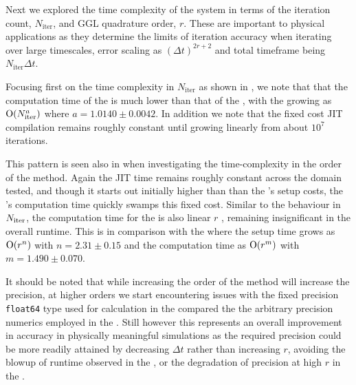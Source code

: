 Next we explored the time complexity of the system in terms of the iteration count, $N_{\text{iter}}$, and GGL quadrature order, $r$. These are important to physical applications as they determine the limits of iteration accuracy when iterating over large timescales, error scaling as $(\Delta t)^{2r + 2}$ and total timeframe being $N_{\text{iter}} \Delta t$.

Focusing first on the time complexity in $N_{\text{iter}}$ as shown in , we note that that the computation time of the \updimpl{} is much lower than that of the \orgimpl{}, with the \updimpl{} growing as $\mathord{\mathrm{O}}(N_{\mathrm{iter}}^a)$ where $a = 1.0140 \pm 0.0042$. In addition we note that the fixed cost JIT compilation remains roughly constant until growing linearly from about $10^7$ iterations.

This pattern is seen also in  when investigating the time-complexity in the order of the method. Again the JIT time remains roughly constant across the domain tested, and though it starts out initially higher than than the \orgimpl{}'s setup costs, the \orgimpl{}'s computation time quickly swamps this fixed cost.
Similar to the behaviour in $N_{\mathrm{iter}}$, the computation time for the \updimpl{} is also linear $r$ , remaining insignificant in the overall runtime. This is in comparison with the \orgimpl{} where the setup time grows as $\mathord{\mathrm{O}}(r^n)$ with $n = {2.31 \pm 0.15}$ and the computation time as $\mathord{\mathrm{O}}(r^m)$ with $m={1.490 \pm 0.070}$.


It should be noted that while increasing the order of the method will increase the precision, at higher orders we start encountering issues with the fixed precision \texttt{float64} type used for calculation in the \updimpl{} compared the the arbitrary precision numerics employed in the \orgimpl{}.
Still however this represents an overall improvement in accuracy in physically meaningful simulations as the required precision could be more readily attained by decreasing $\Delta t$ rather than increasing $r$, avoiding the blowup of runtime observed in the \orgimpl{}, or the degradation of precision at high $r$ in the \updimpl{}. 



